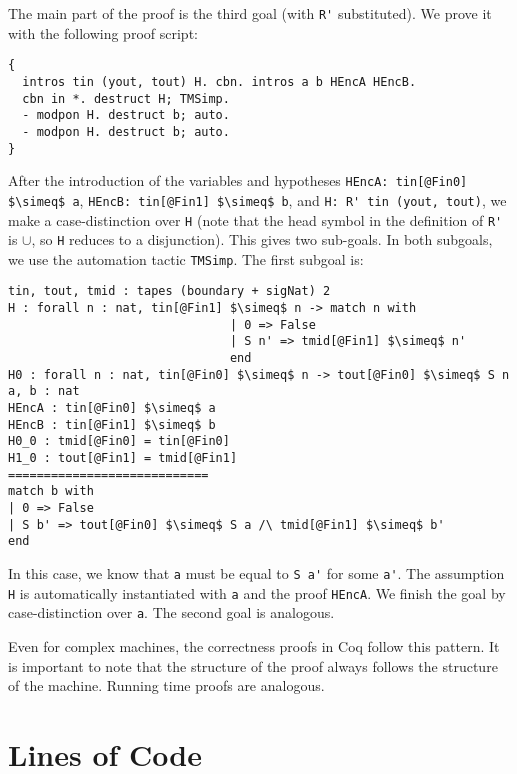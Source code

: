 The main part of the proof is the third goal (with \lstinline!R'! substituted).  We prove it with the following proof script:
\begin{lstlisting}
{
  intros tin (yout, tout) H. cbn. intros a b HEncA HEncB.
  cbn in *. destruct H; TMSimp.
  - modpon H. destruct b; auto.
  - modpon H. destruct b; auto.
}
\end{lstlisting}

After the introduction of the variables and hypotheses \lstinline!HEncA: tin[@Fin0] $\simeq$ a!, \lstinline!HEncB: tin[@Fin1] $\simeq$ b!, and
\lstinline!H: R' tin (yout, tout)!, we make a case-distinction over \lstinline!H! (note that the head symbol in the definition of \lstinline!R'! is
$\cup$, so \lstinline!H! reduces to a disjunction).  This gives two sub-goals.  In both subgoals, we use the automation tactic \lstinline!TMSimp!.
The first subgoal is:
\begin{lstlisting}
tin, tout, tmid : tapes (boundary + sigNat) 2
H : forall n : nat, tin[@Fin1] $\simeq$ n -> match n with
                               | 0 => False
                               | S n' => tmid[@Fin1] $\simeq$ n'
                               end
H0 : forall n : nat, tin[@Fin0] $\simeq$ n -> tout[@Fin0] $\simeq$ S n
a, b : nat
HEncA : tin[@Fin0] $\simeq$ a
HEncB : tin[@Fin1] $\simeq$ b
H0_0 : tmid[@Fin0] = tin[@Fin0]
H1_0 : tout[@Fin1] = tmid[@Fin1]
============================
match b with
| 0 => False
| S b' => tout[@Fin0] $\simeq$ S a /\ tmid[@Fin1] $\simeq$ b'
end
\end{lstlisting}

In this case, we know that \lstinline!a! must be equal to \lstinline!S a'! for some \lstinline!a'!.  The assumption \lstinline!H! is automatically
instantiated with \lstinline!a! and the proof \lstinline!HEncA!.  We finish the goal by case-distinction over \lstinline!a!.  The second goal is
analogous.


Even for complex machines, the correctness proofs in Coq follow this pattern.  It is important to note that the structure of the proof always follows
the structure of the machine.  Running time proofs are analogous.


\section*{Lines of Code}
\label{sec:coq-lines}

